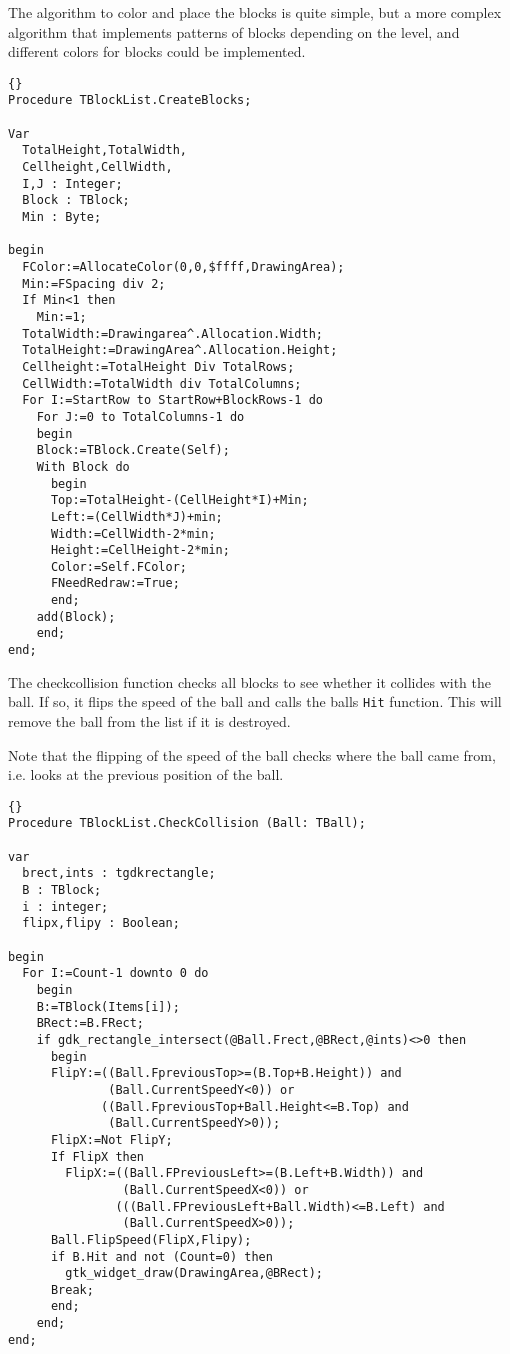 \documentclass[10pt]{article}
\newcommand{\var}[1]{\texttt{#1}}
\begin{document}
The algorithm to color and place the blocks is quite simple, but a more 
complex algorithm that implements patterns of blocks depending on the 
level, and different colors for blocks could be implemented.
\begin{lstlisting}{}
Procedure TBlockList.CreateBlocks;

Var
  TotalHeight,TotalWidth,
  Cellheight,CellWidth,
  I,J : Integer;
  Block : TBlock;
  Min : Byte;
  
begin
  FColor:=AllocateColor(0,0,$ffff,DrawingArea);
  Min:=FSpacing div 2;
  If Min<1 then 
    Min:=1;
  TotalWidth:=Drawingarea^.Allocation.Width;
  TotalHeight:=DrawingArea^.Allocation.Height;
  Cellheight:=TotalHeight Div TotalRows;
  CellWidth:=TotalWidth div TotalColumns;
  For I:=StartRow to StartRow+BlockRows-1 do
    For J:=0 to TotalColumns-1 do
    begin
    Block:=TBlock.Create(Self);
    With Block do
      begin
      Top:=TotalHeight-(CellHeight*I)+Min;
      Left:=(CellWidth*J)+min;
      Width:=CellWidth-2*min;
      Height:=CellHeight-2*min;
      Color:=Self.FColor;
      FNeedRedraw:=True;
      end;
    add(Block);
    end;
end;
\end{lstlisting}
The checkcollision function checks all blocks to see whether it collides with the ball.
If so, it flips the speed of the ball and calls the balls \var{Hit} function. This will
remove the ball from the list if it is destroyed.

Note that the flipping of the speed of the ball checks where the ball came from, i.e.
looks at the previous position of the ball.
\begin{lstlisting}{}
Procedure TBlockList.CheckCollision (Ball: TBall);

var
  brect,ints : tgdkrectangle;
  B : TBlock;
  i : integer;
  flipx,flipy : Boolean;
    
begin
  For I:=Count-1 downto 0 do
    begin
    B:=TBlock(Items[i]);
    BRect:=B.FRect;    
    if gdk_rectangle_intersect(@Ball.Frect,@BRect,@ints)<>0 then
      begin
      FlipY:=((Ball.FpreviousTop>=(B.Top+B.Height)) and 
              (Ball.CurrentSpeedY<0)) or
             ((Ball.FpreviousTop+Ball.Height<=B.Top) and 
              (Ball.CurrentSpeedY>0));
      FlipX:=Not FlipY;
      If FlipX then
        FlipX:=((Ball.FPreviousLeft>=(B.Left+B.Width)) and 
                (Ball.CurrentSpeedX<0)) or
               (((Ball.FPreviousLeft+Ball.Width)<=B.Left) and 
                (Ball.CurrentSpeedX>0));
      Ball.FlipSpeed(FlipX,Flipy);
      if B.Hit and not (Count=0) then 
        gtk_widget_draw(DrawingArea,@BRect);
      Break;
      end;
    end;
end;
\end{lstlisting}
\end{document}
